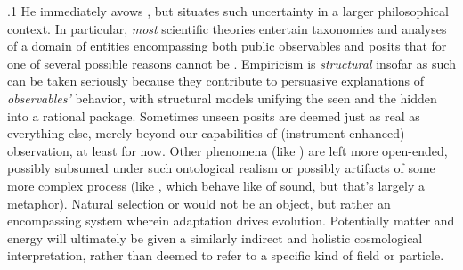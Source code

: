 \documentclass[11pt, twocolumn]{article}
\begin{document}
\p.1{%
He immediately avows , but situates such uncertainty in a larger philosophical context.
In particular, \textit{most} scientific theories entertain taxonomies and analyses of
a domain of entities encompassing both public observables and 
posits that \mdash{} for one of several possible reasons \mdash{} cannot be .
Empiricism is \textit{structural} insofar as such  can be
taken seriously because they contribute to persuasive explanations
of \textit{observables'} behavior, with structural models unifying the seen
and the hidden into a rational package.  Sometimes unseen posits are
deemed just as real as everything else, merely beyond our capabilities
of (instrument-enhanced) observation, at least for now.  Other phenomena
(like ) are left more open-ended, possibly subsumed under
such ontological realism or possibly artifacts of some more complex process
(like , which behave like  of sound, but
that's largely a metaphor).  Natural selection or  would not be an
object, but rather an encompassing system wherein adaptation drives
evolution.  Potentially  matter and energy will ultimately
be given a similarly indirect and holistic cosmological interpretation,
rather than deemed to refer to a specific kind of field or particle.
} %
\end{document}
